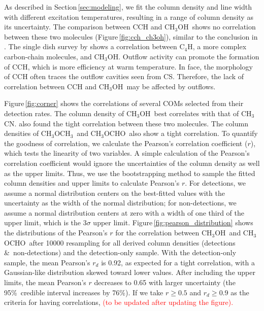 \documentclass[twocolumn]{aastex62}
\newcommand{\methylformate}{\mbox{CH$_{3}$OCHO}}
\newcommand{\methanol}{\mbox{CH$_{3}$OH}}
\newcommand{\dimethylether}{\mbox{CH$_{3}$OCH$_{3}$}}
\newcommand{\methylcyanide}{\mbox{CH$_{3}$CN}}
\begin{document}
As described in Section\,\ref{sec:modeling}, we fit the column density and line width with different excitation temperatures, resulting in a range of column density as its uncertainty.  The comparison between CCH and \methanol\ shows no correlation between these two molecules (Figure\,\ref{fig:cch_ch3oh}), similar to the conclusion in \citet{2018ApJS..236...52H}.  The single dish survey by \citet{2016ApJ...833..125G} shows a correlation between C$_{4}$H, a more complex carbon-chain molecules, and \methanol.  Outflow activity can promote the formation of CCH, which is more efficiency at warm temperature.  In face, the morphology of CCH often traces the outflow cavities seen from CS.  Therefore, the lack of correlation between CCH and \methanol\ may be affected by outflows.

Figure\,\ref{fig:corner} shows the correlations of several COMs selected from their detection rates.  The column density of \methanol\ best correlates with that of \methylcyanide.  \citet{2020A&A...635A.198B} also found the tight correlation between these two molecules.  The column densities of \dimethylether\ and \methylformate\ also show a tight correlation.  To quantify the goodness of correlation, we calculate the Pearson's correlation coefficient ($r$), which tests the linearity of two variables.  A simple calculation of the Pearson's correlation coefficient would ignore the uncertainties of the column density as well as the upper limits.  Thus, we use the bootstrapping method to sample the fitted column densities and upper limits to calculate Pearson's $r$.  For detections, we assume a normal distribution centers on the best-fitted values with the uncertainty as the width of the normal distribution; for non-detections, we assume a normal distribution centers at zero with a width of one third of the upper limit, which is the 3$\sigma$ upper limit.  Figure\,\ref{fig:pearson_distribution} shows the distributions of the Pearson's $r$ for the correlation between \methanol\ and \methylformate\ after 10000 resampling for all derived column densities (detections \&\ non-detections) and the detection-only sample.  With the detection-only sample, the mean Pearson's $r_{d}$ is 0.92, as expected for a tight correlation, with a Gaussian-like distribution skewed toward lower values.  After including the upper limits, the mean Pearson's $r$ decreases to 0.65 with larger uncertainty (the 95\%\ credible interval increases by 76\%).  If we take $r \geq 0.5$ and $r_{d} \geq 0.9$ as the criteria for having correlations, \textcolor{red}{(to be updated after updating the figure).}  
\end{document}
